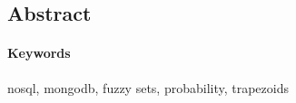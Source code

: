 \begin{otherlanguage}{american}
\section{Abstract}


\paragraph{Keywords} nosql, mongodb, fuzzy sets, probability, trapezoids

\end{otherlanguage}